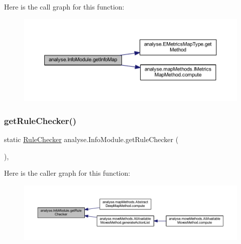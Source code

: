 Here is the call graph for this function\+:
\nopagebreak
\begin{figure}[H]
\begin{center}
\leavevmode
\includegraphics[width=350pt]{classanalyse_1_1_info_module_aff90c966df80003e7495ca1d74116024_cgraph}
\end{center}
\end{figure}
\mbox{\label{classanalyse_1_1_info_module_a03bb959f532b214a07058127e528712b}} 
\subsubsection{\texorpdfstring{get\+Rule\+Checker()}{getRuleChecker()}}
{\footnotesize\ttfamily static \mbox{\hyperlink{classrule_engine_1_1_rule_checker}{Rule\+Checker}} analyse.\+Info\+Module.\+get\+Rule\+Checker (\begin{DoxyParamCaption}{ }\end{DoxyParamCaption})\hspace{0.3cm}{\ttfamily [inline]}, {\ttfamily [static]}}

Here is the caller graph for this function\+:
\nopagebreak
\begin{figure}[H]
\begin{center}
\leavevmode
\includegraphics[width=350pt]{classanalyse_1_1_info_module_a03bb959f532b214a07058127e528712b_icgraph}
\end{center}
\end{figure}
\mbox{\label{classanalyse_1_1_info_module_a0693c1b360ceaad897107c41bddb1576}} 

